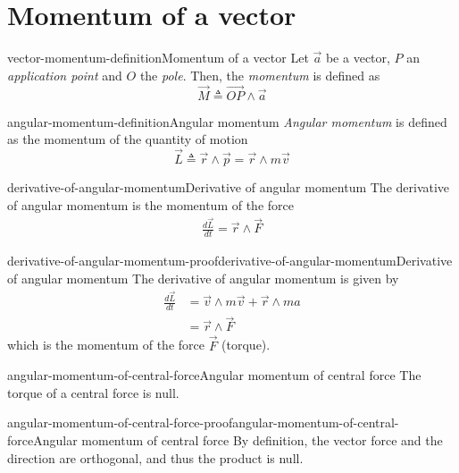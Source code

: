 \documentclass[preview]{standalone}
\begin{document}
\genpage

\section{Momentum of a vector}

\begin{snippetdefinition}{vector-momentum-definition}{Momentum of a vector}
    Let \(\vec{a}\) be a vector, \(P\) an \emph{application point}
    and \(O\) the \emph{pole}. Then, the \emph{momentum} is defined as
    \[
        \vec{M} \triangleq \vec{OP} \wedge \vec{a}
    \]
\end{snippetdefinition}

\begin{snippetdefinition}{angular-momentum-definition}{Angular momentum}
    \emph{Angular momentum} is defined as the momentum of the quantity of motion
    \[
        \vec{L} \triangleq \vec{r} \wedge \vec{p} = \vec{r} \wedge m\vec{v}
    \]
\end{snippetdefinition}

\begin{snippetproposition}{derivative-of-angular-momentum}{Derivative of angular momentum}
    The derivative of angular momentum is the momentum of the force
    \begin{align*}
        \frac{d\vec{L}}{dt} = \vec{r} \wedge \vec{F} 
    \end{align*}
\end{snippetproposition}

\begin{snippetproof}{derivative-of-angular-momentum-proof}{derivative-of-angular-momentum}{Derivative of angular momentum}
    The derivative of angular momentum is given by
    \begin{align*}
        \frac{d\vec{L}}{dt} &= \vec{v} \wedge m\vec{v} + \vec{r} \wedge ma \\
        &= \vec{r} \wedge \vec{F}
    \end{align*}
    which is the momentum of the force \(\vec{F}\) (torque).
\end{snippetproof}

\begin{snippetproposition}{angular-momentum-of-central-force}{Angular momentum of central force}
    The torque of a central force is null.
\end{snippetproposition}

\begin{snippetproof}{angular-momentum-of-central-force-proof}{angular-momentum-of-central-force}{Angular momentum of central force}
    By definition, the vector force and the direction are orthogonal, and thus the product is null.
\end{snippetproof}
\end{document}
